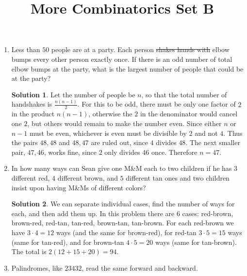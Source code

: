 \documentclass{article}
\title{More Combinatorics Set B}
\author{}
\date{}
\theoremstyle{definition}
\newtheorem*{solution}{Solution}
\begin{document}
\maketitle

\begin{multicols}{2}
    \begin{enumerate}
        \item Less than $50$ people are at a party.
            Each person \sout{shakes hands with} elbow bumps every other person exactly once.
            If there is an odd number of total elbow bumps at the party,
            what is the largest number of people that could be at the party?
            \begin{solution}
                Let the number of people be $n$,
                so that the total number of handshakes is $\frac{n(n - 1)}{2}$.
                For this to be odd, there must be only one factor of $2$ in the product $n(n - 1)$,
                otherwise the $2$ in the denominator would cancel one $2$,
                but others would remain to make the number even.
                Since either $n$ or $n - 1$ must be even,
                whichever is even must be divisible by $2$ and not $4$.
                Thus the pairs $48, 48$ and $48, 47$ are ruled out, since $4$ divides $48$.
                The next smaller pair, $47, 46$, works fine, since $2$ only divides $46$ once.
                Therefore $n = 47$.
            \end{solution}
        \item In how many ways can Sean give one M\&M each to two children
            if he has $3$ different red, $4$ different brown, and $5$ different tan ones
            and two children insist upon having M\&Ms of different colors?
            \begin{solution}
                We can separate individual cases, find the number of ways for each,
                and then add them up.
                In this problem there are $6$ cases:
                red-brown, brown-red, red-tan, tan-red, brown-tan, tan-brown.
                For each red-brown we have $3 \cdot 4 = 12$ ways (and the same for brown-red),
                for red-tan $3 \cdot 5 = 15$ ways (same for tan-red),
                and for brown-tan $4 \cdot 5 = 20$ ways (same for tan-brown).
                The total is $2(12 + 15 + 20) = 94$.
            \end{solution}
        \item Palindromes, like $23432$, read the same forward and backward.

\end{enumerate}
\end{multicols}
\end{document}
